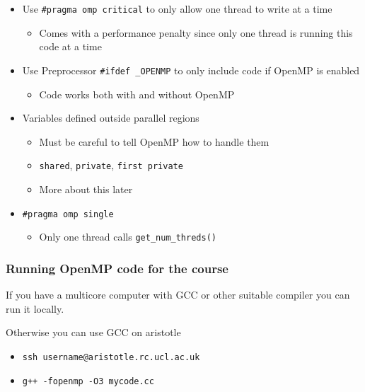 \begin{itemize}
\itemsep1pt\parskip0pt
\item
  Use \texttt{\#pragma omp critical} to only allow one thread to write
  at a time

  \begin{itemize}
  \itemsep1pt\parskip0pt
  \item
    Comes with a performance penalty since only one thread is running
    this code at a time
  \end{itemize}
\item
  Use Preprocessor \texttt{\#ifdef \_OPENMP} to only include code if
  OpenMP is enabled

  \begin{itemize}
  \itemsep1pt\parskip0pt
  \item
    Code works both with and without OpenMP
  \end{itemize}
\item
  Variables defined outside parallel regions

  \begin{itemize}
  \itemsep1pt\parskip0pt
  \item
    Must be careful to tell OpenMP how to handle them
  \item
    \texttt{shared}, \texttt{private}, \texttt{first private}
  \item
    More about this later
  \end{itemize}
\item
  \texttt{\#pragma omp single}

  \begin{itemize}
  \itemsep1pt\parskip0pt
  \item
    Only one thread calls \texttt{get\_num\_threds()}
  \end{itemize}
\end{itemize}

\subsubsection{Running OpenMP code for the
course}\label{running-openmp-code-for-the-course}

If you have a multicore computer with GCC or other suitable compiler you
can run it locally.

Otherwise you can use GCC on aristotle

\begin{itemize}
\itemsep1pt\parskip0pt
\item
  \texttt{ssh username@aristotle.rc.ucl.ac.uk}
\item
  \texttt{g++ -fopenmp -O3 mycode.cc}
\end{itemize}


